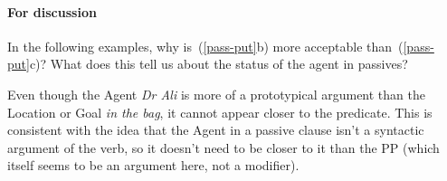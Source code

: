 \documentclass{article}
\begin{document}
\paragraph{For discussion} In the following examples, why is~(\ref{pass-put}b) more acceptable than~(\ref{pass-put}c)? What does this tell us about the status of the agent in passives?
\ea \label{pass-put}
    \z
\z
\begin{answer}
{
Even though the Agent \emph{Dr Ali} is more of a prototypical argument than the Location or Goal \emph{in the bag}, it cannot appear closer to the predicate. This is consistent with the idea that the Agent in a passive clause isn't a syntactic argument of the verb, so it doesn't need to be closer to it than the PP (which itself seems to be an argument here, not a modifier).
}
\end{answer}





\end{document}
